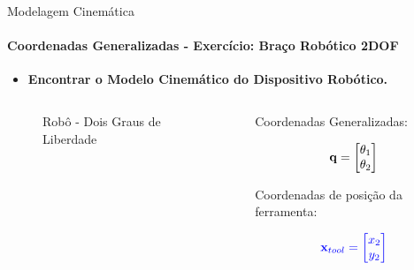 \documentclass{beamer}
\begin{document}
\begin{frame}{Modelagem Cinemática}
    \framesubtitle{Coordenadas Generalizadas - Exercício: Braço Robótico 2DOF}
    \begin{itemize}
        \item \textbf{Encontrar o Modelo Cinemático do Dispositivo Robótico.}
    \end{itemize}

    \begin{columns}
        \begin{column}[c]{0.6\textwidth}
            \begin{figure}[!ht]
                
                \caption{Robô - Dois Graus de Liberdade\footnotemark}
            \end{figure}
        \end{column}
        \begin{column}[c]{0.4\textwidth}
            
            Coordenadas Generalizadas:

            $$
            \color{black}{
                \mathbf{q} = 
                \begin{bmatrix}
                \theta_1 \\
                \theta_2    
                \end{bmatrix}
            }
            $$

            Coordenadas de posição da ferramenta: 

            $$
            \color{blue}{
                \mathbf{x}_{tool} = 
                \begin{bmatrix}
                x_2 \\
                y_2    
                \end{bmatrix}
            }
            $$
        \end{column}
    \end{columns}
\end{frame}
\end{document}

